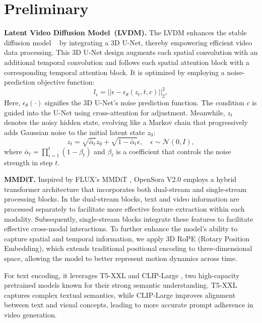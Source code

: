 
\section{Preliminary}
\label{section:preliminary}

\textbf{Latent Video Diffusion Model~(LVDM).}
The LVDM enhances the stable diffusion model ~\cite{ramesh2022hierarchical} by integrating a 3D U-Net, thereby empowering efficient video data processing. This 3D U-Net design augments each spatial convolution with an additional temporal convolution and follows each spatial attention block with a corresponding temporal attention block. It is optimized by employing a noise-prediction objective function:
\begin{equation}
    l_\epsilon = ||\epsilon - \epsilon_\theta(z_t, t, c)||^2_2,
    \label{eq:training_objective}
\end{equation}
Here, $\epsilon_\theta(\cdot)$ signifies the 3D U-Net's noise prediction function. The condition 
$c$ is guided into the U-Net using cross-attention for adjustment. Meanwhile, $z_t$ denotes the noisy hidden state, evolving like a Markov chain that progressively adds Gaussian noise to the initial latent state $z_0$:
\begin{equation}
    z_t=\sqrt{\bar{\alpha}_t}z_0 + \sqrt{1 - \bar{\alpha}_t}\epsilon, \quad\epsilon \sim \mathcal{N}(0, I),
    \label{eq:add_noise}
\end{equation}
where $\bar{\alpha}_t = \prod_{i=1}^t(1-\beta_t)$ and $\beta_t$ is a coefficient that controls the noise strength in step $t$.


    



\noindent \textbf{MMDiT.}
Inspired by FLUX’s MMDiT \cite{flux2024}, OpenSora V2.0 \cite{peng2025opensora20trainingcommerciallevel} employs a hybrid transformer architecture that incorporates both dual-stream and single-stream processing blocks. 
In the dual-stream blocks, text and video information are processed separately to facilitate more effective feature extraction within each modality.
Subsequently, single-stream blocks integrate these features to facilitate effective cross-modal interactions. 
To further enhance the model’s ability to capture spatial and temporal information, we apply 3D RoPE (Rotary Position Embedding), which extends traditional positional encoding to three-dimensional space, allowing the model to better represent motion dynamics across time.

For text encoding, it leverages T5-XXL \cite{chung2024scaling} and CLIP-Large \cite{Radford2021LearningTV}, two high-capacity pretrained models known for their strong semantic understanding. 
T5-XXL captures complex textual semantics,
while CLIP-Large improves alignment between text and visual concepts, leading to more accurate prompt adherence in video generation.
